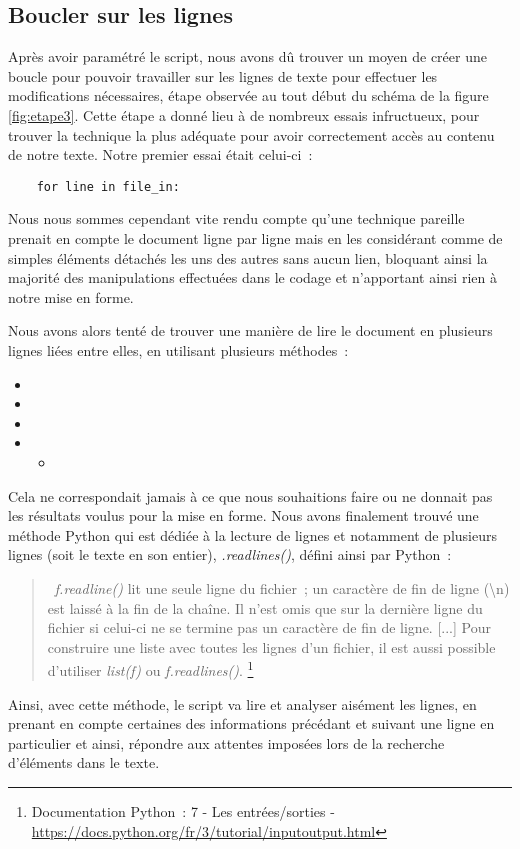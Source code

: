 \subsection{Boucler sur les lignes}
Après avoir paramétré le script, nous avons dû trouver un moyen de créer une boucle pour pouvoir travailler sur les lignes de texte pour effectuer les modifications nécessaires, étape observée au tout début du schéma de la figure \ref{fig:etape3}. Cette étape a donné lieu à de nombreux essais infructueux, pour trouver la technique la plus adéquate pour avoir correctement accès au contenu de notre texte. 
Notre premier essai était celui-ci~: 
\begin{verbatim}
    for line in file_in:
\end{verbatim}
Nous nous sommes cependant vite rendu compte qu'une technique pareille prenait en compte le document ligne par ligne mais en les considérant comme de simples éléments détachés les uns des autres sans aucun lien, bloquant ainsi la majorité des manipulations effectuées dans le codage et n'apportant ainsi rien à notre mise en forme.

Nous avons alors tenté de trouver une manière de lire le document en plusieurs lignes liées entre elles, en utilisant plusieurs méthodes~:
\begin{itemize}
    \item {}
    \item {}
    \item {}
    \item {}
    \begin{itemize}
        \item {}
    \end{itemize}
\end{itemize}
Cela ne correspondait jamais à ce que nous souhaitions faire ou ne donnait pas les résultats voulus pour la mise en forme. Nous avons finalement trouvé une méthode Python qui est dédiée à la lecture de lignes et notamment de plusieurs lignes (soit le texte en son entier), \emph{.readlines()}, défini ainsi par Python~:
\begin{quotation}
\og~\emph{f.readline()} lit une seule ligne du fichier~; un caractère de fin de ligne (\textbackslash n) est laissé à la fin de la chaîne. Il n'est omis que sur la dernière ligne du fichier si celui-ci ne se termine pas un caractère de fin de ligne. [...] Pour construire une liste avec toutes les lignes d'un fichier, il est aussi possible d'utiliser \emph{list(f)} ou \emph{f.readlines()}.\fg{} \footnote{Documentation Python~: 7 - Les entrées/sorties - \url{https://docs.python.org/fr/3/tutorial/inputoutput.html}}
\end{quotation}
Ainsi, avec cette méthode, le script va lire et analyser aisément les lignes, en prenant en compte certaines des informations précédant et suivant une ligne en particulier et ainsi, répondre aux attentes imposées lors de la recherche d'éléments dans le texte.

